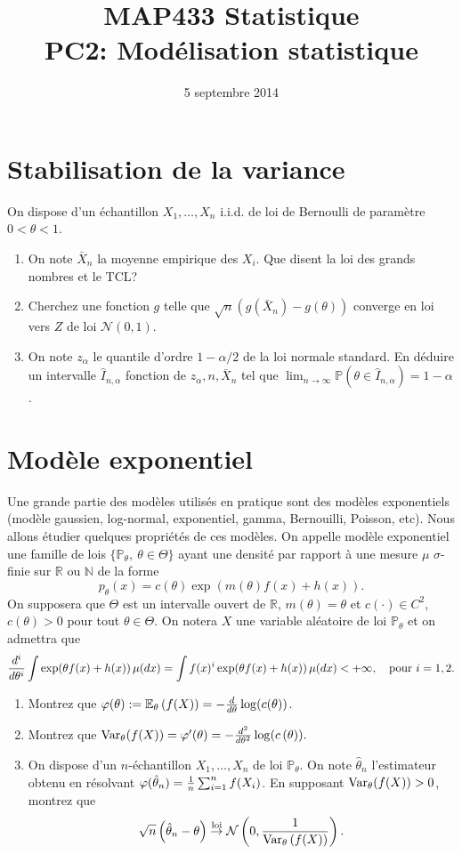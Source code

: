 \documentclass[a4paper,11pt,fleqn]{article}
\title{{\bf MAP433 Statistique}\\
{\bf PC2: Mod\'elisation statistique}}
\date{5 septembre 2014}
\newcommand{\R}{\ensuremath{\mathbb{R}}}
\newcommand{\N}{\mathbb{N}}
\newcommand{\E}{\ensuremath{\mathbb{E}}}
\newcommand{\1}{\ensuremath{\mathbbm{1}}}
\newcommand{\PP}{\ensuremath{\mathbb{P}}}
\newcommand{\p}{\ensuremath{\mathbb{P}}}
\newcommand{\pa}[1]{\left(#1\right)}
\begin{document}
\maketitle

\section{Stabilisation de la variance}
 On dispose d'un
\'echantillon $X_{1},\ldots,X_{n}$ i.i.d. de loi de Bernoulli de
param\`etre $0<\theta<1$.
\begin{enumerate}
\item On note $\bar X_{n}$ la moyenne empirique des $X_{i}$. Que
disent la loi des grands nombres et le TCL?
\item Cherchez une fonction $g$ telle que $\sqrt{n}(g(\bar X_{n})-g(\theta))$
converge en loi vers $Z$ de loi $\mathcal{N}(0,1)$.
\item On note $z_{\alpha}$ le quantile d'ordre $1-\alpha/2$ de la loi normale
standard. En d\'eduire un intervalle $\hat I_{n, \alpha}$ fonction
de $z_{\alpha}, n, \bar X_{n}$ tel que $\lim_{n\to
\infty}\p(\theta\in \hat I_{n,\alpha})=1-\alpha$.
\end{enumerate}



\section{Mod\`ele exponentiel}
Une grande partie des mod\`eles utilis\'es en pratique sont des
mod\`eles exponentiels (mod\`ele gaussien, log-normal, exponentiel,
gamma, Bernouilli, Poisson, etc). Nous allons \'etudier quelques
propri\'et\'es de ces mod\`eles. On appelle mod\`ele exponentiel une
famille de lois $\{\PP_{\theta},\ \theta\in\Theta\}$ ayant une
densit\'e par rapport \`a une mesure $\mu$ $\sigma$-finie sur $\R$
ou $\N$ de la forme
$$p_{\theta}(x)=c(\theta)\exp\pa{m(\theta)f(x)+h(x)}.$$
On supposera que $\Theta$ est un intervalle ouvert de $\R$, $m(\theta)=\theta$
et $c(\cdot)\in C^2$, $c(\theta)>0$ pour tout $\theta\in \Theta$. On
notera $X$ une variable al\'eatoire de loi $\PP_{\theta}$ et on
admettra que
$${d^i\over d \theta^i}\int\exp(\theta f(x)+h(x))\, \mu(dx)=\int f(x)^i\exp(\theta f(x)+h(x))\, \mu(dx)<+\infty,\quad \textrm{pour }i=1,2.$$
 \begin{enumerate}
\item Montrez que
$\varphi(\theta):=\E_{\theta}\pa{f(X)}=-{d\over
d\theta}\log(c(\theta))$.
\item Montrez que ${\rm Var_{\theta}}(f(X))=\varphi'(\theta)=-{d^2\over d\theta^2}\log( c\pa{\theta}).$
\item On dispose d'un $n$-\'echantillon $X_{1},\ldots,X_{n}$ de loi $\p_{\theta}$. On note
$\hat \theta_{n}$ l'estimateur obtenu en r\'esolvant $\varphi(\hat
\theta_{n})={1\over n}\sum_{i=1}^n f(X_{i})$.
En supposant ${\rm Var_{\theta}}(f(X))>0$, montrez que
$$\sqrt{n}\pa{\hat\theta_{n}-\theta}\stackrel{\textrm{loi}}{\to}\mathcal N\pa{0,{1\over {\rm Var}_{\theta}\pa{f(X)}}}.$$
\end{enumerate}
\end{document}
